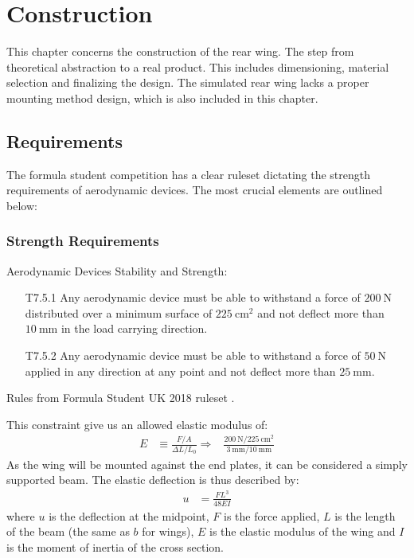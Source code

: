 \chapter{Construction}

  This chapter concerns the construction of the rear wing. The step from theoretical abstraction to a real product. This includes dimensioning, material selection and finalizing the design. The simulated rear wing lacks a proper mounting method design, which is also included in this chapter.

\section{Requirements}

  The formula student competition has a clear ruleset dictating the strength requirements of aerodynamic devices. The most crucial elements are outlined below:

  \subsection{Strength Requirements}
    \begin{tcolorbox}[colframe=seapurple,colback=seapurple!1]
      Aerodynamic Devices Stability and Strength:
      \begin{itemize}
        \item [T7.5.1] Any aerodynamic device must be able to withstand a force of $\SI{200}{\newton}$ distributed over a minimum surface of $\SI{225}{\centi\metre\squared}$ and not deflect more than $\SI{10}{\milli\metre}$ in the load carrying direction.
        \item [T7.5.2] Any aerodynamic device must be able to withstand a force of $\SI{50}{\newton}$ applied in any direction at any point and not deflect more than $\SI{25}{\milli\metre}$.
      \end{itemize}
      \vspace{5pt}
      \hspace*{\fill}\tiny{Rules from Formula Student UK 2018 ruleset \cite{FSrules18}.}
    \end{tcolorbox}

    This constraint give us an allowed elastic modulus of:
    \begin{align}
      E &\equiv \frac{F/A}{\Delta L/{L_0}}
      \Rightarrow&
      \frac{\SI{200}{\newton}
      /
      \SI{225}{\centi\metre\squared}}
      {\SI{3}{\milli\metre}/\SI{10}{\milli\metre}}
    \end{align}
    As the wing will be mounted against the end plates, it can be considered a simply supported beam. The elastic deflection is thus described by:
    \begin{align}
      u &= \frac{FL^3}{48EI}
    \end{align}
    where $u$ is the deflection at the midpoint, $F$ is the force applied, $L$ is the length of the beam (the same as $b$ for wings), $E$ is the elastic modulus of the wing and $I$ is the moment of inertia of the cross section.

